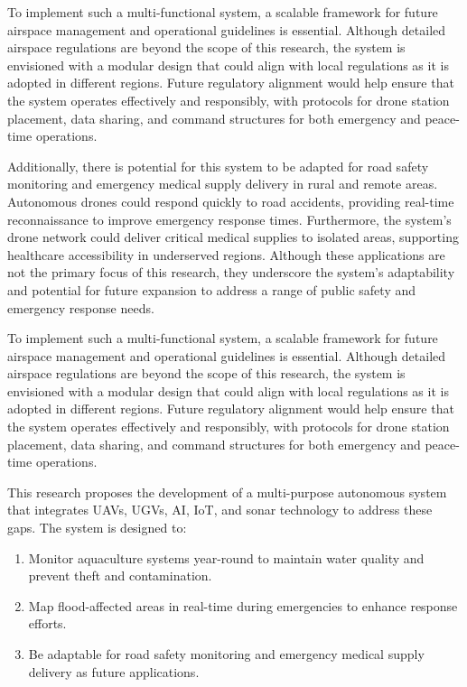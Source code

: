 \documentclass[conference]{IEEEtran}
\begin{document}
To implement such a multi-functional system, a scalable framework for future airspace management and operational guidelines is essential. Although detailed airspace regulations are beyond the scope of this research, the system is envisioned with a modular design that could align with local regulations as it is adopted in different regions. Future regulatory alignment would help ensure that the system operates effectively and responsibly, with protocols for drone station placement, data sharing, and command structures for both emergency and peace-time operations.

Additionally, there is potential for this system to be adapted for road safety monitoring and emergency medical supply delivery in rural and remote areas. Autonomous drones could respond quickly to road accidents, providing real-time reconnaissance to improve emergency response times. Furthermore, the system’s drone network could deliver critical medical supplies to isolated areas, supporting healthcare accessibility in underserved regions. Although these applications are not the primary focus of this research, they underscore the system’s adaptability and potential for future expansion to address a range of public safety and emergency response needs.

To implement such a multi-functional system, a scalable framework for future airspace management and operational guidelines is essential. Although detailed airspace regulations are beyond the scope of this research, the system is envisioned with a modular design that could align with local regulations as it is adopted in different regions. Future regulatory alignment would help ensure that the system operates effectively and responsibly, with protocols for drone station placement, data sharing, and command structures for both emergency and peace-time operations.

This research proposes the development of a multi-purpose autonomous system that integrates UAVs, UGVs, AI, IoT, and sonar technology to address these gaps. The system is designed to:

\begin{enumerate}
	\item Monitor aquaculture systems year-round to maintain water quality and prevent theft and contamination.
	\item Map flood-affected areas in real-time during emergencies to enhance response efforts.
	\item Be adaptable for road safety monitoring and emergency medical supply delivery as future applications.
\end{enumerate}
\end{document}
